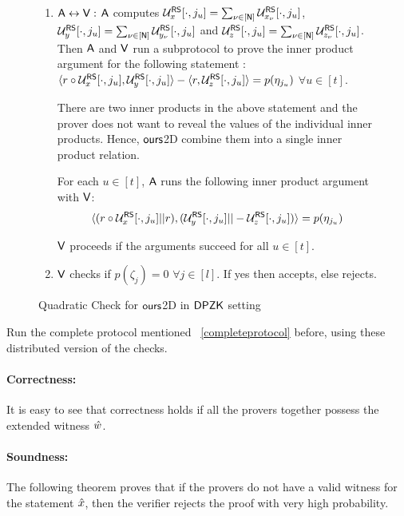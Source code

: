\begin{figure}[h!]
\begin{framed}
\begin{enumerate}
			\item $\mathsf{A} \leftrightarrow \mathsf{V} : $ $\mathsf{A}$ computes $\mathcal{U}^{\mathsf{RS}}_{x}[\cdot, j_u] = \sum_{\nu \in [\mathsf{N}]} \mathcal{U}^{\mathsf{RS}}_{x_{\nu}}[\cdot, j_u]$, $\mathcal{U}^{\mathsf{RS}}_{y}[\cdot, j_u] = \sum_{\nu \in [\mathsf{N}]} \mathcal{U}^{\mathsf{RS}}_{y_{\nu}}[\cdot, j_u]$ and $\mathcal{U}^{\mathsf{RS}}_{z}[\cdot, j_u] = \sum_{\nu \in [\mathsf{N}]} \mathcal{U}^{\mathsf{RS}}_{z_{\nu}}[\cdot, j_u]$.
			Then $\mathsf{A}$ and $\mathsf{V}$ run a subprotocol to prove the inner product argument for the following statement : $\langle r\circ \mathcal{U}^{\mathsf{RS}}_x[\cdot, j_u],\mathcal{U}^{\mathsf{RS}}_y[\cdot,j_u]\rangle - \langle r,\mathcal{U}^{\mathsf{RS}}_{z}[\cdot, j_u]\rangle = p(\eta_{j_u})$ $\forall u\in [t]$.
	
	There are two inner products in the above statement and the prover does not want to reveal the values of the individual inner products. Hence, $\textsf{ours}$2D combine them into a single inner product relation. 
	
	For each $u\in[t]$, $\mathsf{A}$ runs the following inner product argument with $\mathsf{V}$: 
	$$\langle (r \circ \mathcal{U}^{\mathsf{RS}}_{x}[\cdot, j_u]|| r),(\mathcal{U}^{\mathsf{RS}}_{y}[\cdot, j_u]|| - \mathcal{U}^{\mathsf{RS}}_{z}[\cdot, j_u])\rangle = p(\eta_{j_u})$$
	
	$\mathsf{V}$ proceeds if the arguments succeed for all $u\in[t]$.
	
			\item $\mathsf{V}$ checks if $p(\zeta_j) = 0$ $\forall j \in [l]$. If yes then accepts, else rejects.
		\end{enumerate}
	\end{framed}
	\caption{Quadratic Check for $\textsf{ours}$2D in $\mathsf{DPZK}$ setting}
\end{figure}
Run the complete protocol mentioned ~\ref{completeprotocol} before, using these distributed version of the checks.

\paragraph{Correctness: } It is easy to see that correctness holds if all the provers together possess the extended witness $\hat{w}$. 

\paragraph{Soundness: } The following theorem proves that if the provers do not have a valid witness for the statement $\hat{x}$, then the verifier rejects the proof with very high probability.

